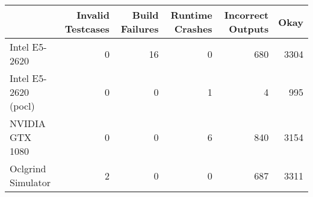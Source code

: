 \begin{tabular}{lrrrrr}
\toprule
{} &  Invalid Testcases &  Build Failures &  Runtime Crashes &  Incorrect Outputs &  Okay \\
\midrule
Intel E5-2620        &                  0 &              16 &                0 &                680 &  3304 \\
Intel E5-2620 (pocl) &                  0 &               0 &                1 &                  4 &   995 \\
NVIDIA GTX 1080      &                  0 &               0 &                6 &                840 &  3154 \\
Oclgrind Simulator   &                  2 &               0 &                0 &                687 &  3311 \\
\bottomrule
\end{tabular}
